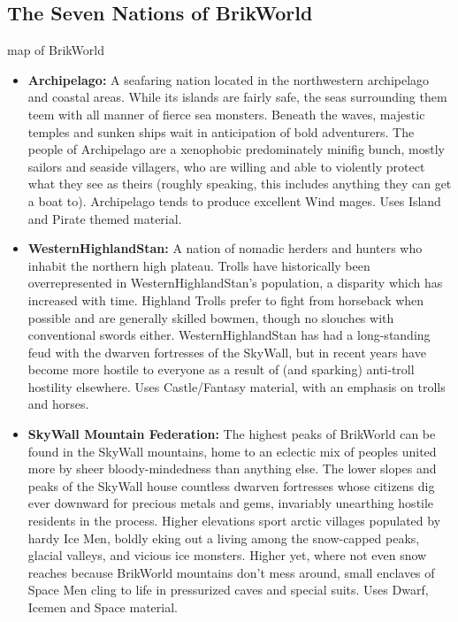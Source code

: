 \documentclass[12pt,a4paper,twocolumn]{article}
\begin{document}
\subsection{The Seven Nations of BrikWorld}

map of BrikWorld

\begin{itemize}
\item {\bf Archipelago:} A seafaring nation located in the northwestern archipelago and coastal areas.  While its islands are fairly safe, the seas surrounding them teem with all manner of fierce sea monsters.  Beneath the waves, majestic temples and sunken ships wait in anticipation of bold adventurers.  The people of Archipelago are a xenophobic predominately minifig bunch, mostly sailors and seaside villagers, who are willing and able to violently protect what they see as theirs (roughly speaking, this includes anything they can get a boat to).  Archipelago tends to produce excellent Wind mages.  Uses Island and Pirate themed material.

\item {\bf WesternHighlandStan:} A nation of nomadic herders and hunters who inhabit the northern high plateau.  Trolls have historically been overrepresented in WesternHighlandStan's population, a disparity which has increased with time.  Highland Trolls prefer to fight from horseback when possible and are generally skilled bowmen, though no slouches with conventional swords either.  WesternHighlandStan has had a long-standing feud with the dwarven fortresses of the SkyWall, but in recent years have become more hostile to everyone as a result of (and sparking) anti-troll hostility elsewhere.  Uses Castle/Fantasy material, with an emphasis on trolls and horses.

\item {\bf SkyWall Mountain Federation:} The highest peaks of BrikWorld can be found in the SkyWall mountains, home to an eclectic mix of peoples united more by sheer bloody-mindedness than anything else.  The lower slopes and peaks of the SkyWall house countless dwarven fortresses whose citizens dig ever downward for precious metals and gems, invariably unearthing hostile residents in the process.  Higher elevations sport arctic villages populated by hardy Ice Men, boldly eking out a living among the snow-capped peaks, glacial valleys, and vicious ice monsters.  Higher yet, where not even snow reaches because BrikWorld mountains don't mess around, small enclaves of Space Men cling to life in pressurized caves and special suits.  Uses Dwarf, Icemen and Space material.


\end{itemize}
\end{document}
